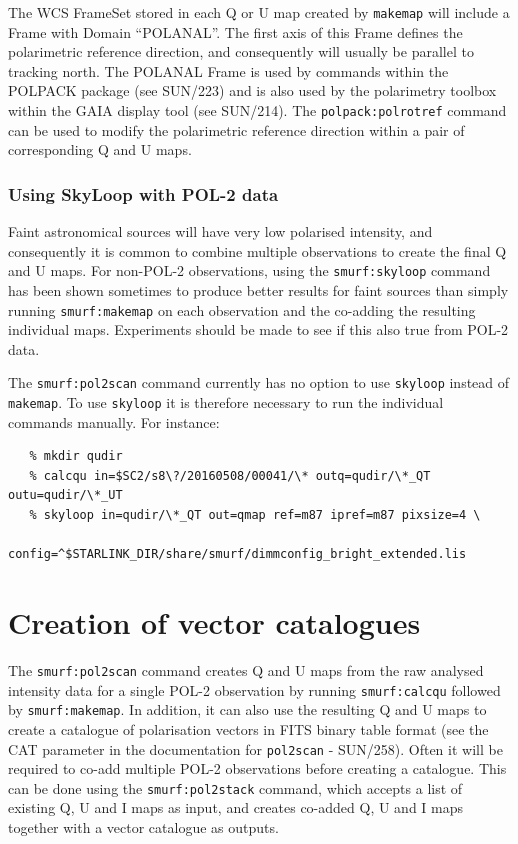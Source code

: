 \documentclass[twoside,11pt]{starlink}
\begin{document}
The WCS FrameSet stored in each Q or U map created by \texttt{makemap} will
include a Frame with Domain ``POLANAL''. The first axis of this Frame
defines the polarimetric reference direction, and consequently will
usually be parallel to tracking north. The POLANAL Frame is used by
commands within the POLPACK package (see SUN/223) and is also used by the
polarimetry toolbox within the GAIA display tool (see SUN/214). The
\texttt{polpack:polrotref} command can be used to modify the polarimetric
reference direction within a pair of corresponding Q and U maps.

\subsubsection{Using SkyLoop with POL-2 data}
\label{sec:skyloop}
Faint astronomical sources will have very low polarised intensity, and
consequently it is common to combine multiple observations to create the
final Q and U maps. For non-POL-2 observations, using the
\texttt{smurf:skyloop} command has been shown sometimes to produce better
results for faint sources than simply running \texttt{smurf:makemap} on
each observation and the co-adding the resulting individual maps.
Experiments should be made to see if this also true from POL-2 data.

The \texttt{smurf:pol2scan} command currently has no option to use
\texttt{skyloop} instead of \texttt{makemap}. To use \texttt{skyloop} it
is therefore necessary to run the individual commands manually. For
instance:

\begin{verbatim}
   % mkdir qudir
   % calcqu in=$SC2/s8\?/20160508/00041/\* outq=qudir/\*_QT outu=qudir/\*_UT
   % skyloop in=qudir/\*_QT out=qmap ref=m87 ipref=m87 pixsize=4 \
        config=^$STARLINK_DIR/share/smurf/dimmconfig_bright_extended.lis
\end{verbatim}

\section{Creation of vector catalogues}
\label{sec:vectors}
The \texttt{smurf:pol2scan} command creates Q and U maps from the raw
analysed intensity data for a single POL-2 observation by running
\texttt{smurf:calcqu} followed by \texttt{smurf:makemap}. In addition, it
can also use the resulting Q and U maps to create a catalogue of
polarisation vectors in FITS binary table format (see the CAT parameter
in the documentation for \texttt{pol2scan} - SUN/258). Often it will be
required to co-add multiple POL-2 observations before creating a
catalogue. This can be done using the \texttt{smurf:pol2stack} command,
which accepts a list of existing Q, U and I maps as input, and creates
co-added Q, U and I maps together with a vector catalogue as outputs.
\end{document}
